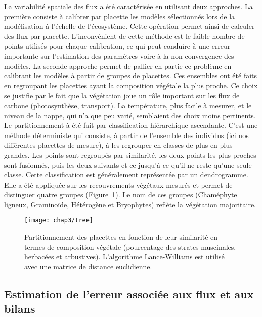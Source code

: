 La variabilité spatiale des flux a été caractérisée en utilisant deux approches.
La première consiste à calibrer par placette les modèles sélectionnés lors de la modélisation à l'échelle de l'écosystème.
Cette opération permet ainsi de calculer des flux par placette.
L'inconvénient de cette méthode est le faible nombre de points utilisés pour chaque calibration, ce qui peut conduire à une erreur importante sur l'estimation des paramètres voire à la non convergence des modèles.
La seconde approche permet de pallier en partie ce problème en calibrant les modèles à partir de groupes de placettes.
Ces ensembles ont été faits en regroupant les placettes ayant la composition végétale la plus proche.
Ce choix se justifie par le fait que la végétation joue un rôle important sur les flux de carbone (photosynthèse, transport).
La température, plus facile à mesurer, et le niveau de la nappe, qui n'a que peu varié, semblaient des choix moins pertinents. 
Le partitionnement à été fait par classification hiérarchique ascendante.
C'est une méthode déterministe qui consiste, à partir de l'ensemble des individus (ici nos différentes placettes de mesure), à les regrouper en classes de plus en plus grandes.
Les points sont regroupés par similarité, les deux points les plus proches sont fusionnés, puis les deux suivants et ce jusqu'à ce qu'il ne reste qu'une seule classe.
Cette classification est généralement représentée par un dendrogramme.
Elle a été appliquée sur les recouvrements végétaux mesurés et permet de distinguer quatre groupes (Figure~\ref{fig:tree}).
Le nom de ces groupes (Chaméphyte ligneux, Graminoïde, Hétérogène et Bryophytes) reflète la végétation majoritaire.

\begin{figure}[t]
\centering
\texttt{[image: chap3/tree]}
\caption{Partitionnement des placettes en fonction de leur similarité en termes de composition végétale (pourcentage des strates muscinales, herbacées et arbustives). L'algorithme Lance-Williams est utilisé avec une matrice de distance euclidienne.}
\label{fig:tree}
\end{figure}


\subsection{Estimation de l'erreur associée aux flux et aux bilans}
\label{subsec:erreur_bilan}

